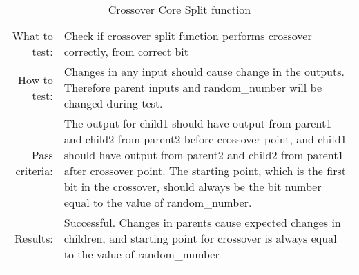 \begin{table}[H]
  \begin{tabular}{r | p{9cm}}
    \noalign{\smallskip}\hline\noalign{\smallskip}
    
    What to test:  & Check if crossover split function performs crossover correctly, 
                        from correct bit \\

    \noalign{\smallskip}\hline\noalign{\smallskip}

    How to test:   &    Changes in any input should cause change in the outputs.
                        Therefore parent inputs and random\_number will be changed
                        during test. 
                        \\
                      
    \noalign{\smallskip}\hline\noalign{\smallskip}

    Pass criteria: &    The output for child1 should have output from parent1 and child2
                        from parent2 before crossover point, and child1 should have
                        output from parent2 and child2 from parent1 after crossover
                        point. 
                        The starting point, which is the first bit in the crossover,
                        should always be the bit number equal to the value of
                        random\_number.
                        \\
    \noalign{\smallskip}\hline\noalign{\smallskip}
    
    Results: &      Successful. 
                    Changes in parents cause expected changes in children, and starting 
                    point for crossover is always equal to the value of random\_number
                    \\
   \noalign{\smallskip}\hline\noalign{\smallskip}
  
  
  
  \end{tabular}
  \caption{Crossover Core Split function}
  \label{testing:components:genetic_pipeline:crossover_core_split}
\end{table}
